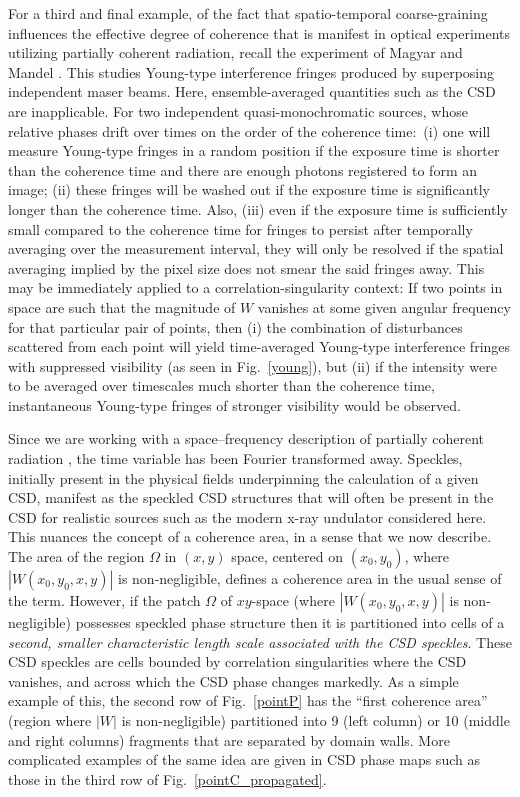 \documentclass[%
 reprint,
 amsmath,amssymb,
 aps,
]{revtex4-1}
\begin{document}
For a third and final example, of the fact that spatio-temporal coarse-graining influences the effective degree of coherence that is manifest in optical experiments utilizing partially coherent radiation, recall the experiment of Magyar and Mandel \cite{MagyarMandel1963}.  This studies Young-type interference fringes produced by superposing independent maser beams.  Here, ensemble-averaged quantities such as the CSD are inapplicable.  For two independent quasi-monochromatic sources, whose relative phases drift over times on the order of the coherence time:~(i) one will measure Young-type fringes in a random position if the exposure time is shorter than the coherence time and there are enough photons registered to form an image; (ii) these fringes will be washed out if the exposure time is significantly longer than the coherence time.  Also, (iii) even if the exposure time is sufficiently small compared to the coherence time for fringes to persist after temporally averaging over the measurement interval, they will only be resolved if the spatial averaging implied by the pixel size does not smear the said fringes away.  This may be immediately applied to a correlation-singularity context: If two points in space are such that the magnitude of $W$ vanishes at some given angular frequency for that particular pair of points, then (i) the combination of disturbances scattered from each point will yield time-averaged Young-type interference fringes with suppressed visibility (as seen in Fig.~\ref{young}), but (ii) if the intensity were to be averaged over timescales much shorter than the coherence time, instantaneous Young-type fringes of stronger visibility would be observed.   

Since we are working with a space--frequency description of partially coherent radiation \cite{Wolf1982,mandel_wolf,wolf_thin_book}, the time variable has been Fourier transformed away.  Speckles, initially present in the physical fields underpinning the calculation of a given CSD, manifest as the speckled CSD structures that will often be present in the CSD for realistic sources such as the modern x-ray undulator considered here.  This nuances the concept of a coherence area, in a sense that we now describe.  The area of the region $\Omega$ in $(x,y)$ space, centered on $(x_0,y_0)$, where $|W(x_0,y_0,x,y)|$ is non-negligible, defines a coherence area in the usual sense of the term.  However, if the patch $\Omega$ of $xy$-space (where $|W(x_0,y_0,x,y)|$ is non-negligible) possesses speckled phase structure then it is partitioned into cells of a {\em second, smaller characteristic length scale associated with the CSD speckles}.  These CSD speckles are cells bounded by correlation singularities where the CSD vanishes, and across which the CSD phase changes markedly.  As a simple example of this, the second row of Fig.~\ref{pointP} has the ``first coherence area'' (region where $|W|$ is non-negligible) partitioned into 9 (left column) or 10 (middle and right columns) fragments that are separated by domain walls.  More complicated examples of the same idea are given in CSD phase maps such as those in the third row of Fig.~\ref{pointC_propagated}.
\end{document}

